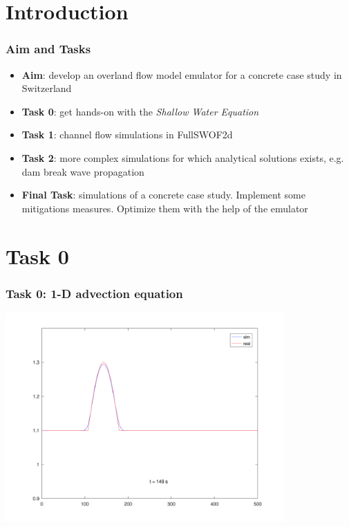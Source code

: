 \documentclass[xcolor=dvipsnames, USenglish]{beamer}  %
\begin{document}
\section{Introduction}

  \begin{frame}
    \frametitle{Aim and Tasks}
    \begin{itemize}
      \item \textbf{Aim}: develop an overland flow model emulator for a concrete case study in Switzerland
      \item \textbf{Task 0}: get hands-on with the \emph{Shallow Water Equation}
      \item \textbf{Task 1}: channel flow simulations in FullSWOF2d
      \item \textbf{Task 2}: more complex simulations for which analytical
        solutions exists, e.g. dam break wave propagation
      \item \textbf{Final Task}: simulations of a concrete case study. Implement
        some mitigations measures. Optimize them with the help of the emulator
     \end{itemize}
  \end{frame}


\section{Task 0}

  \begin{frame}
    \frametitle{Task 0: 1-D advection equation}
    \centering
    \includegraphics[width=0.8\textwidth]{img/advection.png}
  \end{frame}
\end{document}
